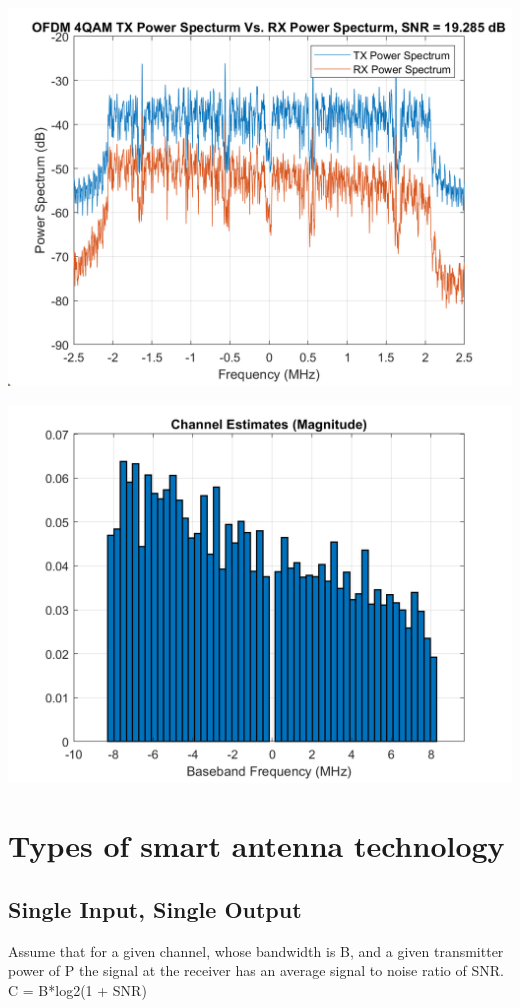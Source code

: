 \documentclass[12pt]{report}
\begin{document}
\includegraphics[width=\columnwidth]{RX_VS_TX_PSD.png}

\includegraphics[width=\columnwidth]{channel_est.png}
\section*{Types of smart antenna technology}
\subsection*{Single Input, Single Output}
Assume that for a given channel, whose bandwidth is B, and a given
transmitter power of P the signal at the receiver has an average signal
to noise ratio of SNR.\\
C = B*log2(1 + SNR)
\end{document}
